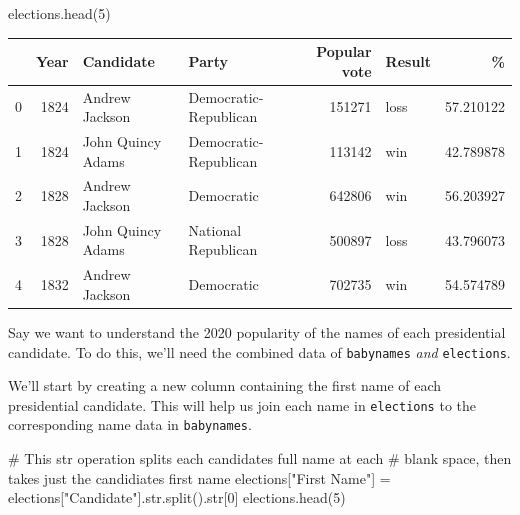\documentclass[
  letterpaper,
  DIV=11,
  numbers=noendperiod]{scrreprt}
\newenvironment{Shaded}{\begin{snugshade}}{\end{snugshade}}
\newcommand{\BuiltInTok}[1]{\textcolor[rgb]{0.00,0.23,0.31}{#1}}
\newcommand{\CommentTok}[1]{\textcolor[rgb]{0.37,0.37,0.37}{#1}}
\newcommand{\DecValTok}[1]{\textcolor[rgb]{0.68,0.00,0.00}{#1}}
\newcommand{\NormalTok}[1]{\textcolor[rgb]{0.00,0.23,0.31}{#1}}
\newcommand{\OperatorTok}[1]{\textcolor[rgb]{0.37,0.37,0.37}{#1}}
\newcommand{\StringTok}[1]{\textcolor[rgb]{0.13,0.47,0.30}{#1}}
\begin{document}
\begin{Shaded}
\begin{Highlighting}[]
\NormalTok{elections.head(}\DecValTok{5}\NormalTok{)}
\end{Highlighting}
\end{Shaded}

\begin{tabular}{lrllrlr}
\toprule
{} &  Year &          Candidate &                  Party &  Popular vote & Result &          \% \\
\midrule
0 &  1824 &     Andrew Jackson &  Democratic-Republican &        151271 &   loss &  57.210122 \\
1 &  1824 &  John Quincy Adams &  Democratic-Republican &        113142 &    win &  42.789878 \\
2 &  1828 &     Andrew Jackson &             Democratic &        642806 &    win &  56.203927 \\
3 &  1828 &  John Quincy Adams &    National Republican &        500897 &   loss &  43.796073 \\
4 &  1832 &     Andrew Jackson &             Democratic &        702735 &    win &  54.574789 \\
\bottomrule
\end{tabular}

Say we want to understand the 2020 popularity of the names of each
presidential candidate. To do this, we'll need the combined data of
\texttt{babynames} \emph{and} \texttt{elections}.

We'll start by creating a new column containing the first name of each
presidential candidate. This will help us join each name in
\texttt{elections} to the corresponding name data in \texttt{babynames}.

\begin{Shaded}
\begin{Highlighting}[]
\CommentTok{\# This \textasciigrave{}str\textasciigrave{} operation splits each candidate\textquotesingle{}s full name at each }
\CommentTok{\# blank space, then takes just the candidiate\textquotesingle{}s first name}
\NormalTok{elections[}\StringTok{"First Name"}\NormalTok{] }\OperatorTok{=}\NormalTok{ elections[}\StringTok{"Candidate"}\NormalTok{].}\BuiltInTok{str}\NormalTok{.split().}\BuiltInTok{str}\NormalTok{[}\DecValTok{0}\NormalTok{]}
\NormalTok{elections.head(}\DecValTok{5}\NormalTok{)}
\end{Highlighting}
\end{Shaded}
\end{document}
